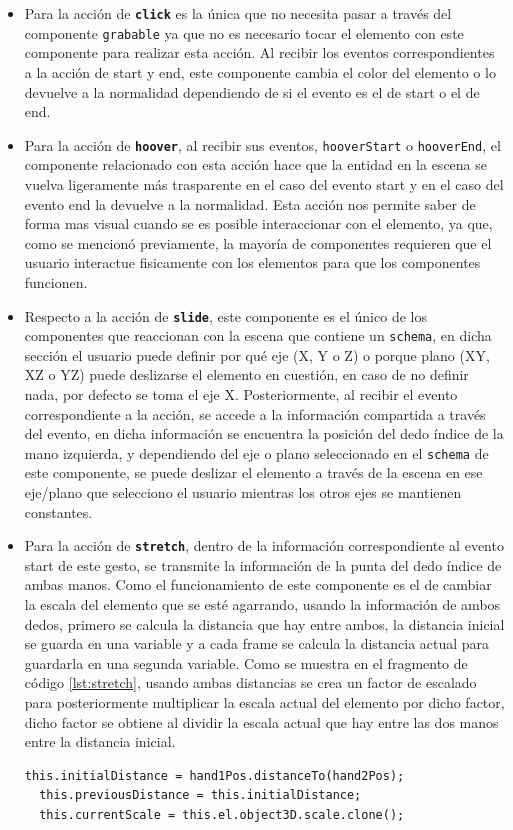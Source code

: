 \documentclass[a4paper, 12pt]{book}
\begin{document}
\begin{itemize}
  \item Para la acción de \textbf{\texttt{click}} es la única que no necesita pasar a través del componente \texttt{grabable} ya que no es necesario tocar el elemento con este componente para realizar esta acción. 
Al recibir los eventos correspondientes a la acción de start y end, este componente cambia el color del elemento o lo devuelve a la normalidad dependiendo de si el evento es el de start o el de end. 

  \item Para la acción de \textbf{\texttt{hoover}}, al recibir sus eventos, \texttt{hooverStart} o \texttt{hooverEnd}, el componente relacionado con esta acción hace que la entidad en la escena se vuelva ligeramente más trasparente en el caso del evento start y en el caso del evento end la devuelve a la normalidad. Esta acción nos permite saber de forma mas visual cuando se es posible interaccionar con el elemento, ya que, como se mencionó previamente, la mayoría de componentes requieren que el usuario interactue fisicamente con los elementos para que los componentes funcionen.

  \item Respecto a la acción de \textbf{\texttt{slide}}, este componente es el único de los componentes que reaccionan con la escena que contiene un \texttt{schema}, en dicha sección el usuario puede definir por qué eje (X, Y o Z) o porque plano (XY, XZ o YZ) puede deslizarse el elemento en cuestión, en caso de no definir nada, por defecto se toma el eje X. Posteriormente, al recibir el evento correspondiente a la acción, se accede a la información compartida a través del evento, en dicha información se encuentra la posición del dedo índice de la mano izquierda, y dependiendo del eje o plano seleccionado en el \texttt{schema} de este componente, se puede deslizar el elemento a través de la escena en ese eje/plano que selecciono el usuario mientras los otros ejes se mantienen constantes.

  \item Para la acción de \textbf{\texttt{stretch}}, dentro de la información correspondiente al evento start de este gesto, se transmite la información de la punta del dedo índice de ambas manos. Como el funcionamiento de este componente es el de cambiar la escala del elemento que se esté agarrando, usando la información de ambos dedos, primero se calcula la distancia que hay entre ambos, la distancia inicial se guarda en una variable y a cada frame se calcula la distancia actual para guardarla en una segunda variable. Como se muestra en el fragmento de código \ref{lst:stretch}, usando ambas distancias se crea un factor de escalado para posteriormente multiplicar la escala actual del elemento por dicho factor, dicho factor se obtiene al dividir la escala actual que hay entre las dos manos entre la distancia inicial.
\begin{lstlisting}[caption=Actualización del factor de escala, captionpos=b, label=lst:stretch]
  this.initialDistance = hand1Pos.distanceTo(hand2Pos);
  this.previousDistance = this.initialDistance;
  this.currentScale = this.el.object3D.scale.clone();


\end{lstlisting}
\end{itemize}
\end{document}
